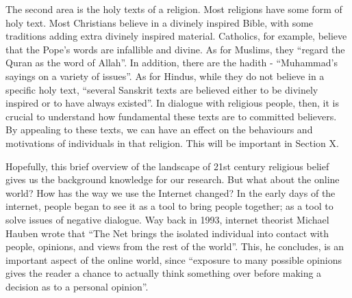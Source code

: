 \documentclass[]{article}
\begin{document}
The second area is the holy texts of a religion. Most religions have
some form of holy text. Most Christians believe in a divinely inspired
Bible, with some traditions adding extra divinely inspired material.
Catholics, for example, believe that the Pope's words are infallible and
divine. As for Muslims, they ``regard the Quran as the word of
Allah''\autocite[pg 83]{Boyett12MajorWorld2016}. In addition, there are
the hadith - ``Muhammad's sayings on a variety of
issues''\autocite[pg 83]{Boyett12MajorWorld2016}. As for Hindus, while
they do not believe in a specific holy text, ``several Sanskrit texts
are believed either to be divinely inspired or to have always
existed''\autocite[pg 104]{Boyett12MajorWorld2016}. In dialogue with
religious people, then, it is crucial to understand how fundamental
these texts are to committed believers. By appealing to these texts, we
can have an effect on the behaviours and motivations of individuals in
that religion. This will be important in Section X.

Hopefully, this brief overview of the landscape of 21st century
religious belief gives us the background knowledge for our research. But
what about the online world? How has the way we use the Internet
changed? In the early days of the internet, people began to see it as a
tool to bring people together; as a tool to solve issues of negative
dialogue. Way back in 1993, internet theorist Michael Hauben wrote that
``The Net brings the isolated individual into contact with people,
opinions, and views from the rest of the
world''\autocite{HaubenNetNetizensImpact1993}. This, he concludes, is an
important aspect of the online world, since ``exposure to many possible
opinions gives the reader a chance to actually think something over
before making a decision as to a personal
opinion''\autocite{HaubenNetNetizensImpact1993}.
\end{document}
